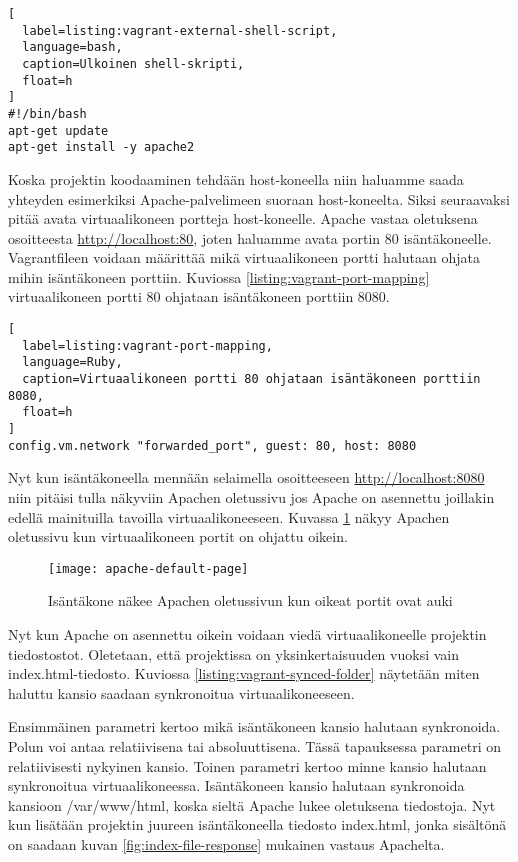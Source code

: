 \begin{lstlisting}[
  label=listing:vagrant-external-shell-script,
  language=bash,
  caption=Ulkoinen shell-skripti,
  float=h
]
#!/bin/bash
apt-get update
apt-get install -y apache2
\end{lstlisting}

Koska projektin koodaaminen tehdään host-koneella niin haluamme saada yhteyden esimerkiksi Apache-palvelimeen suoraan host-koneelta. Siksi seuraavaksi pitää avata virtuaalikoneen portteja host-koneelle. Apache vastaa oletuksena osoitteesta \url{http://localhost:80}, joten haluamme avata portin 80 isäntäkoneelle. Vagrantfileen voidaan määrittää mikä virtuaalikoneen portti halutaan ohjata mihin isäntäkoneen porttiin. Kuviossa \ref{listing:vagrant-port-mapping} virtuaalikoneen portti 80 ohjataan isäntäkoneen porttiin 8080.

\begin{lstlisting}[
  label=listing:vagrant-port-mapping,
  language=Ruby,
  caption=Virtuaalikoneen portti 80 ohjataan isäntäkoneen porttiin 8080,
  float=h
]
config.vm.network "forwarded_port", guest: 80, host: 8080
\end{lstlisting}

Nyt kun isäntäkoneella mennään selaimella osoitteeseen \url{http://localhost:8080} niin pitäisi tulla näkyviin Apachen oletussivu jos Apache on asennettu joillakin edellä mainituilla tavoilla virtuaalikoneeseen. Kuvassa \ref{fig:apache-default-page} näkyy Apachen oletussivu kun virtuaalikoneen portit on ohjattu oikein.

\begin{figure}[h]
  \texttt{[image: apache-default-page]}
  \caption{Isäntäkone näkee Apachen oletussivun kun oikeat portit ovat auki}
  \label{fig:apache-default-page}
\end{figure}

Nyt kun Apache on asennettu oikein voidaan viedä virtuaalikoneelle projektin tiedostostot. Oletetaan, että projektissa on yksinkertaisuuden vuoksi vain index.html-tiedosto. Kuviossa \ref{listing:vagrant-synced-folder} näytetään miten haluttu kansio saadaan synkronoitua virtuaalikoneeseen.

Ensimmäinen parametri kertoo mikä isäntäkoneen kansio halutaan synkronoida. Polun voi antaa relatiivisena tai absoluuttisena. Tässä tapauksessa parametri on relatiivisesti nykyinen kansio. Toinen parametri kertoo minne kansio halutaan synkronoitua virtuaalikoneessa. Isäntäkoneen kansio halutaan synkronoida kansioon /var/www/html, koska sieltä Apache lukee oletuksena tiedostoja. Nyt kun lisätään projektin juureen isäntäkoneella tiedosto index.html, jonka sisältönä on  saadaan kuvan \ref{fig:index-file-response} mukainen vastaus Apachelta.

